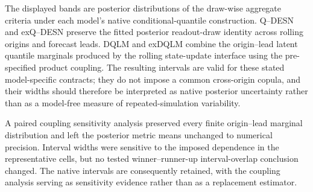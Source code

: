 The displayed bands are posterior distributions of the draw-wise aggregate criteria under each model's native conditional-quantile construction. Q--DESN and exQ--DESN preserve the fitted posterior readout-draw identity across rolling origins and forecast leads. DQLM and exDQLM combine the origin--lead latent quantile marginals produced by the rolling state-update interface using the pre-specified product coupling. The resulting intervals are valid for these stated model-specific contracts; they do not impose a common cross-origin copula, and their widths should therefore be interpreted as native posterior uncertainty rather than as a model-free measure of repeated-simulation variability.

A paired coupling sensitivity analysis preserved every finite origin--lead marginal distribution and left the posterior metric means unchanged to numerical precision. Interval widths were sensitive to the imposed dependence in the representative cells, but no tested winner--runner-up interval-overlap conclusion changed. The native intervals are consequently retained, with the coupling analysis serving as sensitivity evidence rather than as a replacement estimator.
